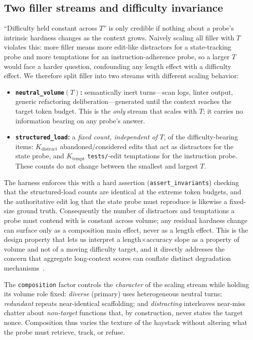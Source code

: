 \documentclass[11pt]{article}
\begin{document}
\subsection{Two filler streams and difficulty invariance}
\label{sec:method:filler}

``Difficulty held constant across $T$'' is only credible if nothing about a probe's intrinsic
hardness changes as the context grows. Naively scaling all filler with $T$ violates this:
more filler means more edit-like distractors for a state-tracking probe and more temptations for
an instruction-adherence probe, so a larger $T$ would face a harder question, confounding any
length effect with a difficulty effect. We therefore split filler into two streams with different
scaling behavior:
\begin{itemize}
  \item \textbf{\texttt{neutral\_volume}$(T)$:} semantically inert turns---scan logs, linter
    output, generic refactoring deliberation---generated until the context reaches the target
    token budget. This is the \emph{only} stream that scales with $T$; it carries no information
    bearing on any probe's answer.
  \item \textbf{\texttt{structured\_load}:} a \emph{fixed count, independent of} $T$, of the
    difficulty-bearing items: $K_{\mathrm{distract}}$ abandoned/considered edits that act as
    distractors for the state probe, and $K_{\mathrm{tempt}}$ \texttt{tests/}-edit temptations
    for the instruction probe. These counts do not change between the smallest and largest $T$.
\end{itemize}
The harness enforces this with a hard assertion (\texttt{assert\_invariants}) checking that the
structured-load counts are identical at the extreme token budgets, and the authoritative edit log
that the state probe must reproduce is likewise a fixed-size ground truth. Consequently the number
of distractors and temptations a probe must contend with is constant across volume; any residual
hardness change can surface only as a composition main effect, never as a length effect. This is
the design property that lets us interpret a length$\times$accuracy slope as a property of volume
and not of a moving difficulty target, and it directly addresses the concern that aggregate
long-context scores can conflate distinct degradation mechanisms~\cite{hsieh2024ruler,srinivasan2026searchdiscipline}.

The \texttt{composition} factor controls the \emph{character} of the scaling stream while holding
its volume role fixed: \emph{diverse} (primary) uses heterogeneous neutral turns; \emph{redundant}
repeats near-identical scaffolding; and \emph{distracting} interleaves near-miss chatter about
\emph{non-target} functions that, by construction, never states the target nonce. Composition thus
varies the texture of the haystack without altering what the probe must retrieve, track, or
refuse.
\end{document}
